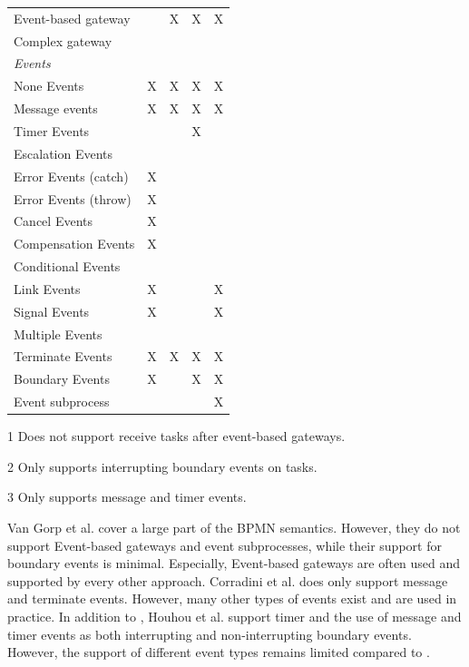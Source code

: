 \documentclass[submission, copyright, creativecommons]{eptcs}
\begin{document}
\begin{table}[htbp]
\begin{threeparttable}
\begin{tabular}{l l l l l}
      Event-based gateway &  & X\tnote{1} & X & X\\ %
      Complex gateway & & & &\\
      \textit{Events} & & & & \\
      None Events & X & X & X & X\\
      Message events & X & X & X & X\\
      Timer Events & & & X & \\
      Escalation Events & & & & \\
      Error Events (catch) & X & & &\\
      Error Events (throw) & X & & &\\
      Cancel Events & X & & &\\
      Compensation Events & X & & &\\
      Conditional Events & & & &\\
      Link Events & X & & & X\\
      Signal Events & X & & & X\\
      Multiple Events &  & & & \\
      Terminate Events & X & X & X & X\\
     Boundary Events & X\tnote{2} & & X\tnote{3} & X\\ %
      Event subprocess &  &  &  & X\\
    \end{tabular}
    \begin{tablenotes}
        \item[1] Does not support receive tasks after event-based gateways.
        \item[2] Only supports interrupting boundary events on tasks.
        \item[3] Only supports message and timer events.
    \end{tablenotes}
    \end{threeparttable}
\end{table}

Van Gorp et al. \cite{vangorpVisualTokenbasedFormalization2013} cover a large part of the BPMN semantics.
However, they do not support Event-based gateways and event subprocesses, while their support for boundary events is minimal.
Especially, Event-based gateways are often used and supported by every other approach.
Corradini et al. \cite{corradiniFormalApproachAnalysis2021} does only support message and terminate events.
However, many other types of events exist and are used in practice.
In addition to \cite{corradiniFormalApproachAnalysis2021}, Houhou et al. \cite{houhouFirstOrderLogicVerification2022} support timer and the use of message and timer events as both interrupting and non-interrupting boundary events.
However, the support of different event types remains limited compared to \cite{vangorpVisualTokenbasedFormalization2013}.
\end{document}
